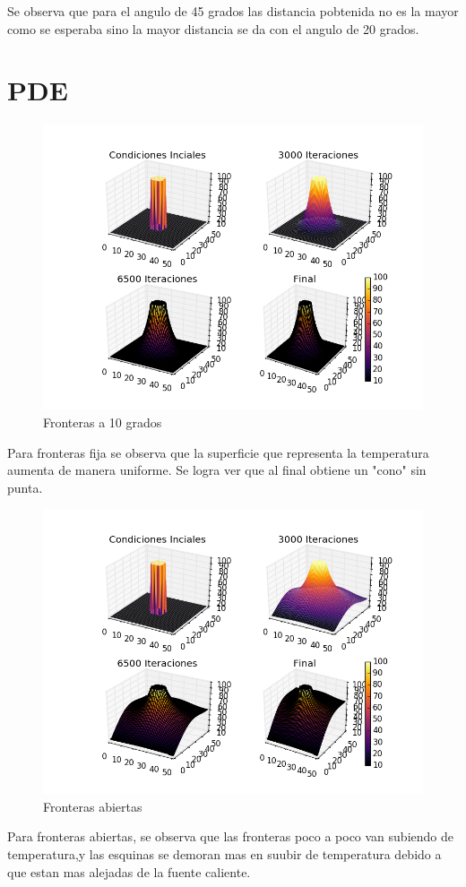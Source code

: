 \documentclass{article}
\begin{document}
Se observa que para el angulo de 45 grados las distancia pobtenida no es la mayor como se esperaba sino la mayor distancia se da con el angulo de 20 grados.\\





\section{PDE}
\begin{figure}[h]
\centering
\includegraphics[scale=0.9]{Normales.png}
\caption{Fronteras a 10 grados}
\label{fig:universe}
\end{figure}
Para fronteras fija se observa que la superficie que representa la temperatura aumenta de manera uniforme. Se logra ver que al final obtiene un "cono" sin punta.

\begin{figure}[h]
\centering
\includegraphics[scale=0.9]{Abiertas.png}
\caption{Fronteras abiertas}
\label{fig:universe}
\end{figure}
Para fronteras abiertas, se observa que las fronteras poco a poco van subiendo de temperatura,y las esquinas se demoran mas en suubir de temperatura debido a que estan mas alejadas de la fuente caliente. \\
\end{document}
